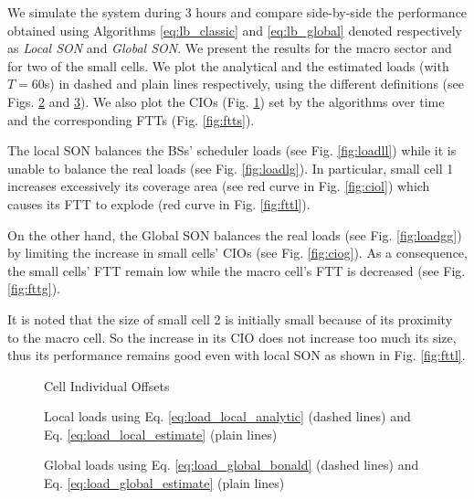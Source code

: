 \documentclass[10pt,draftclsnofoot,onecolumn]{IEEEtran}
\begin{document}
    We simulate the system during 3 hours and compare
side-by-side the performance obtained using Algorithms
\eqref{eq:lb_classic} and \eqref{eq:lb_global}
denoted respectively as \textit{Local SON} and
\textit{Global SON}. We present the results for the macro sector and for
two of the small cells. We plot the analytical and the
estimated loads (with $T = 60$s) in dashed and plain lines respectively,
using the different definitions (see Figs. \ref{fig:loadsl}
and \ref{fig:loadsg}). We also plot the \acp{CIO} (Fig. \ref{fig:cios})
set by the algorithms over time and the corresponding \acp{FTT} (Fig. \ref{fig:ftts}).

    The local SON balances the \acp{BS}'
scheduler loads (see Fig. \ref{fig:loadll}) while it is unable
to balance the real loads (see Fig. \ref{fig:loadlg}).
In particular, small cell 1 increases excessively its coverage
area (see red curve in Fig. \ref{fig:ciol}) which causes its
\ac{FTT} to explode (red curve in Fig. \ref{fig:fttl}).

    On the other hand, the Global SON balances the real
loads (see Fig. \ref{fig:loadgg}) by limiting the increase in
small cells' \acp{CIO} (see Fig. \ref{fig:ciog}). As a consequence,
the small cells' \ac{FTT} remain low
while the macro cell's \ac{FTT} is decreased
(see Fig. \ref{fig:fttg}).

It is noted that the size of small cell 2 is initially small because of
its proximity to the macro cell. So the increase in its \ac{CIO}
does not increase too much its size, thus its performance
remains good even with local SON as shown in Fig. \ref{fig:fttl}.


\begin{figure}[ht]
\centering
{}
\quad
{}
\caption{Cell Individual Offsets}
\label{fig:cios}
\end{figure}


\begin{figure}[ht]
\centering
{}
\quad
{}
\caption{Local loads using Eq. \eqref{eq:load_local_analytic} (dashed lines) and Eq. \eqref{eq:load_local_estimate} (plain lines)}
\label{fig:loadsl}
\end{figure}


\begin{figure}[ht]
\centering
{}
\quad
{}
\caption{Global loads using Eq. \eqref{eq:load_global_bonald} (dashed lines) and  Eq. \eqref{eq:load_global_estimate} (plain lines)} \label{fig:loadsg}
\end{figure}
\end{document}
